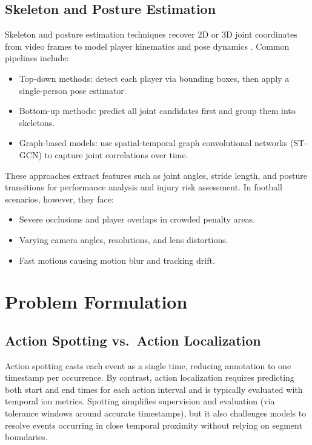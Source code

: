 \subsection{Skeleton and Posture Estimation}
\label{ssec:skeleton_posture_estimation}

Skeleton and posture estimation techniques recover 2D or 3D joint coordinates from video frames to model player kinematics and pose dynamics \cite{elaoud_skeleton-based_2020, wang_skeleton_two-stream_2023, reilly__skeleton_just_pi_2023}. Common pipelines include:
\begin{itemize}
    \item Top-down methods: detect each player via bounding boxes, then apply a single-person pose estimator.
    \item Bottom-up methods: predict all joint candidates first and group them into skeletons.
    \item Graph-based models: use spatial-temporal graph convolutional networks (ST-GCN) to capture joint correlations over time\cite{yan_spatial_temporal_graph_convolutional_2018}.
\end{itemize}
These approaches extract features such as joint angles, stride length, and posture transitions for performance analysis and injury risk assessment. In football scenarios, however, they face:
\begin{itemize}
    \item Severe occlusions and player overlaps in crowded penalty areas.
    \item Varying camera angles, resolutions, and lens distortions.
    \item Fast motions causing motion blur and tracking drift\cite{survey_of_survey}.
\end{itemize} 


\section{Problem Formulation}
\label{sec:problem_formulation}

\subsection{Action Spotting vs.\ Action Localization}
Action spotting casts each event as a single time, reducing annotation to one timestamp per occurrence. By contrast, action localization requires predicting both start and end times for each action interval and is typically evaluated with temporal \acrfull{iou} metrics. Spotting simplifies supervision and evaluation (via tolerance windows around accurate timestamps), but it also challenges models to resolve events occurring in close temporal proximity without relying on segment boundaries.

